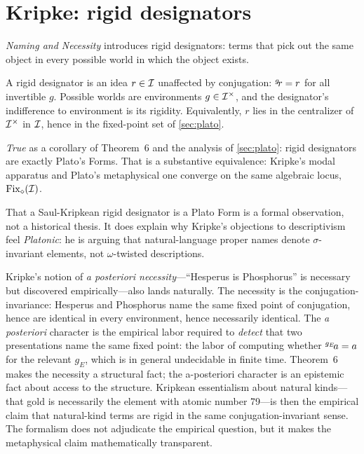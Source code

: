 \section{Kripke: rigid designators}\label{sec:kripke}

 \emph{Naming and Necessity}
\cite{Kripke1980} introduces rigid designators: terms that pick out the
same object in every possible world in which the object exists.

\formalclaim A rigid designator is an idea $r\in\mathcal{I}$ unaffected by
conjugation: ${}^{g}\!r = r$ for all invertible $g$. Possible worlds
are environments $g\in\mathcal{I}^{\times}$, and the designator's
indifference to environment is its rigidity. Equivalently, $r$ lies in
the centralizer of $\mathcal{I}^{\times}$ in $\mathcal{I}$, hence in the
fixed-point set of \cref{sec:plato}.

\formalstatus \emph{True} as a corollary of Theorem~6 and the analysis
of \cref{sec:plato}: rigid designators are exactly Plato's Forms.
That is a substantive equivalence: Kripke's modal apparatus and
Plato's metaphysical one converge on the same algebraic locus,
$\mathrm{Fix}_{\mathbin{\diamond}}(\mathcal{I})$.

\litcomment That a Saul-Kripkean rigid designator is a Plato Form is a
formal observation, not a historical thesis. It does explain why
Kripke's objections to descriptivism feel \emph{Platonic}: he is
arguing that natural-language proper names denote $\sigma$-invariant
elements, not $\omega$-twisted descriptions.

Kripke's notion of \emph{a posteriori necessity}---``Hesperus is
Phosphorus'' is necessary but discovered empirically---also lands
naturally. The necessity is the conjugation-invariance: Hesperus and
Phosphorus name the same fixed point of conjugation, hence are
identical in every environment, hence necessarily identical. The
\emph{a posteriori} character is the empirical labor required to
\emph{detect} that two presentations name the same fixed point: the
labor of computing whether ${}^{g_E}\!a = a$ for the relevant $g_E$,
which is in general undecidable in finite time. Theorem~6 makes the
necessity a structural fact; the a-posteriori character is an
epistemic fact about access to the structure. Kripkean essentialism
about natural kinds---that gold is necessarily the element with atomic
number 79---is then the empirical claim that natural-kind terms are
rigid in the same conjugation-invariant sense. The formalism does not
adjudicate the empirical question, but it makes the metaphysical claim
mathematically transparent.

